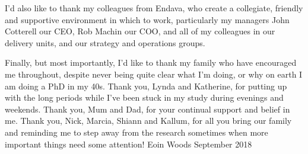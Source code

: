 \documentclass[a4paper, oneside, 11pt, hidelinks]{Thesis}  %
\begin{document}
{{I'd also like to thank my colleagues from Endava, who create a collegiate, friendly and supportive environment in which to work, particularly my managers John Cotterell our CEO, Rob Machin our COO, and all of my colleagues in our delivery units, and our strategy and operations groups.

Finally, but most importantly, I'd like to thank my family who have encouraged me throughout, despite never being quite clear what I'm doing, or why on earth I am doing a PhD in my 40s.  Thank you, Lynda and Katherine, for putting up with the long periods while I've been stuck in my study during evenings and weekends.  Thank you, Mum and Dad, for your continual support and belief in me.  Thank you, Nick, Marcia, Shiann and Kallum, for all you bring our family and reminding me to step away from the research sometimes when more important things need some attention!
\newline
\newline
\newline
Eoin Woods \newline
September 2018

}
\clearpage  %

\pagestyle{empty}  %



\mainmatter	  %
\pagestyle{plain}  %





}
\end{document}
